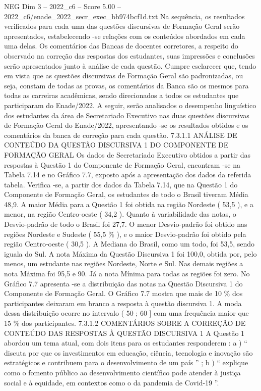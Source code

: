 \begin{textsample}{NEG Dim 3 – 2022\_c6 – Score 5.00 – 2022\_c6/enade\_2022\_secr\_exec\_bb974bcf1d.txt}
Na sequência, os resultados verificados para cada uma das questões discursivas de Formação Geral serão apresentados, estabelecendo -se relações com os conteúdos abordados em cada uma delas.
Os comentários das Bancas de docentes corretores, a respeito do observado na correção das respostas dos estudantes, suas impressões e conclusões serão apresentados junto à análise de cada questão.
Cumpre esclarecer que, tendo em vista que as questões discursivas de Formação Geral são padronizadas, ou seja, constam de todas as provas, os comentários da Banca são os mesmos para todas as carreiras acadêmicas, sendo direcionados a todos os estudantes que participaram do Enade/2022.
A seguir, serão analisados o desempenho linguístico dos estudantes da área de Secretariado Executivo nas duas questões discursivas de Formação Geral do Enade/2022, apresentando -se os resultados obtidos e os comentários da banca de correção para cada questão. 7.3.1.1 ANÁLISE DE CONTEÚDO DA QUESTÃO DISCURSIVA 1 DO COMPONENTE DE FORMAÇÃO GERAL Os dados de Secretariado Executivo obtidos a partir das respostas à Questão 1 do Componente de Formação Geral, encontram -se na Tabela 7.14 e no Gráfico 7.7, exposto após a apresentação dos dados da referida tabela.
Verifica -se, a partir dos dados da Tabela 7.14, que na Questão 1 do Componente de Formação Geral, os estudantes de todo o Brasil tiveram Média 48,9.
A maior Média para a Questão 1 foi obtida na região Nordeste ( 53,5 ), e a menor, na região Centro-oeste ( 34,2 ).
Quanto à variabilidade das notas, o Desvio-padrão de todo o Brasil foi 27,7.
O menor Desvio-padrão foi obtido nas regiões Nordeste e Sudeste ( 55,5 \% ), e o maior Desvio-padrão foi obtido pela região Centro-oeste ( 30,5 ).
A Mediana do Brasil, como um todo, foi 53,5, sendo iguala do Sul.
A nota Máxima da Questão Discursiva 1 foi 100,0, obtida por, pelo menos, um estudante nas regiões Nordeste, Norte e Sul.
Nas demais regiões a nota Máxima foi 95,5 e 90.
Já a nota Mínima para todas as regiões foi zero.
No Gráfico 7.7 apresenta -se a distribuição das notas na Questão Discursiva 1 do Componente de Formação Geral.
O Gráfico 7.7 mostra que mais de 10 \% dos participantes deixaram em branco a resposta à questão discursiva 1.
A moda dessa distribuição ocorre no intervalo ( 50 ; 60 ] com uma frequência maior que 15 \% dos participantes. 7.3.1.2 COMENTÁRIOS SOBRE A CORREÇÃO DE CONTEÚDO DAS RESPOSTAS À QUESTÃO DISCURSIVA 1 A Questão 1 abordou um tema atual, com dois itens para os estudantes responderem : a ) “ discuta por que os investimentos em educação, ciência, tecnologia e inovação são estratégicos e contribuem para o desenvolvimento de um país ” ; b ) “ explique como o fomento público ao desenvolvimento científico pode atender à justiça social e à equidade, em contextos como o da pandemia de Covid-19 ”.

\end{textsample}
